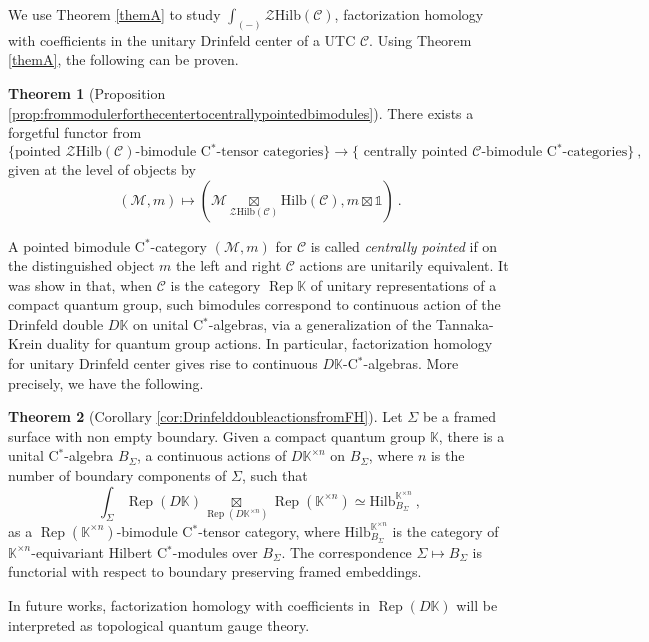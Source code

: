\documentclass[a4paper,11pt,reqno]{amsart}
\numberwithin{equation}{section}
\theoremstyle{remark}
\theoremstyle{definition}
\newtheorem{theoremAlph}{Theorem}
\newcommand{\bK}{\mathbb K}
\newcommand{\cC}{\mathcal C}
\newcommand{\cM}{\mathcal M}
\newcommand{\cZ}{\mathcal Z}
\DeclareMathOperator{\Rep}{Rep}
\newcommand\un{{\mathds 1}}
\newcommand{\Hilb}{\mathrm{Hilb}}
\begin{document}
We use Theorem \ref{themA} to study $\int_{(-)} \cZ \Hilb(\cC)$, factorization homology with coefficients in the unitary Drinfeld center of a UTC $\cC$. Using Theorem \ref{themA}, the following can be proven.

\begin{theoremAlph}[Proposition \ref{prop:frommodulerforthecentertocentrallypointedbimodules}]
	There exists a forgetful functor from 
	\[
	\lbrace \text{pointed $\cZ \Hilb(\cC)$-bimodule C$^*$-tensor categories} \rbrace \to \lbrace \text{ centrally pointed $\cC$-bimodule C$^*$-categories} \rbrace \ ,
	\]
	given at the level of objects by 
	\[
	(\cM,m) \mapsto \left( \cM \underset{\cZ \Hilb(\cC)}{\boxtimes} \Hilb(\cC), m \boxtimes \un \right) \ . 
	\]
	\label{thmB}
\end{theoremAlph} 

A pointed bimodule C$^*$-category $(\cM,m)$ for $\cC$ is called {\em centrally pointed} if on the distinguished object $m$ the left and right $\cC$ actions are unitarily equivalent. It was show in \cite{hataishi2025categorical} that, when $\cC$ is the category $\Rep \bK$ of unitary representations of a compact quantum group, such bimodules correspond to continuous action of the Drinfeld double $D \bK$ on unital C$^*$-algebras, via a generalization of the Tannaka-Krein duality for quantum group actions. In particular, factorization homology for unitary Drinfeld center gives rise to continuous $D \bK$-C$^*$-algebras. More precisely, we have the following.

\begin{theoremAlph}[Corollary \ref{cor:DrinfelddoubleactionsfromFH}]
	Let $\Sigma$ be a framed surface with non empty boundary. Given a compact quantum group $\bK$, there is a unital C$^*$-algebra $B_\Sigma$, a continuous actions of $D\bK^{\times n}$ on $B_\Sigma$, where $n$ is the number of boundary components of $\Sigma$, such that
	\[
	\int_{\Sigma} \Rep(D\bK) \underset{\Rep(D\bK^{\times n})}{\boxtimes} \Rep(\bK^{\times n}) \simeq \Hilb^{\bK^{\times n}}_{B_\Sigma} \ , 
	\]
	as a $\Rep(\bK^{\times n})$-bimodule C$^*$-tensor category, where $\Hilb^{\bK^{\times n}}_{B_\Sigma}$ is the category of $\bK^{\times n}$-equivariant Hilbert C$^*$-modules over $B_\Sigma$. The correspondence $\Sigma \mapsto B_\Sigma$ is functorial with respect to boundary preserving framed embeddings.
	\label{thmC}
\end{theoremAlph}

In future works, factorization homology with coefficients in $\Rep (D\bK)$ will be interpreted as topological quantum gauge theory.
\medskip
\end{document}
